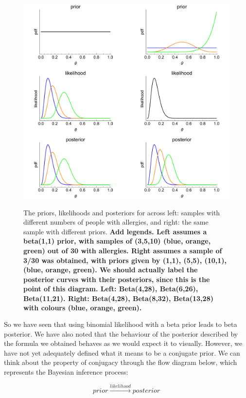 \documentclass[11pt,fullpage]{book}
\begin{document}
\begin{figure}
\centering
\scalebox{0.3} 
{\includegraphics{Conjugate_binomial.pdf}}
\caption{The priors, likelihoods and posteriors for across left: samples with different numbers of people with allergies, and right: the same sample with different priors. \textbf{Add legends. Left assumes a beta(1,1) prior, with samples of (3,5,10) (blue, orange, green) out of 30 with allergies. Right assumes a sample of 3/30 was obtained, with priors given by (1,1), (5,5), (10,1), (blue, orange, green). We should actually label the posterior curves with their posteriors, since this is the point of this diagram. Left: Beta(4,28), Beta(6,26), Beta(11,21). Right: Beta(4,28), Beta(8,32), Beta(13,28) with colours (blue, orange, green).}}\label{fig:Conjugate_binomial}
\end{figure}

So we have seen that using binomial likelihood with a beta prior leads to beta posterior. We have also noted that the behaviour of the posterior described by the formula we obtained behaves as we would expect it to visually. However, we have not yet adequately defined what it means to be a conjugate prior. We can think about the property of conjugacy through the flow diagram below, which represents the Bayesian inference process:

\begin{equation}
prior\xrightarrow{likelihood} posterior 
\end{equation}
\end{document}
